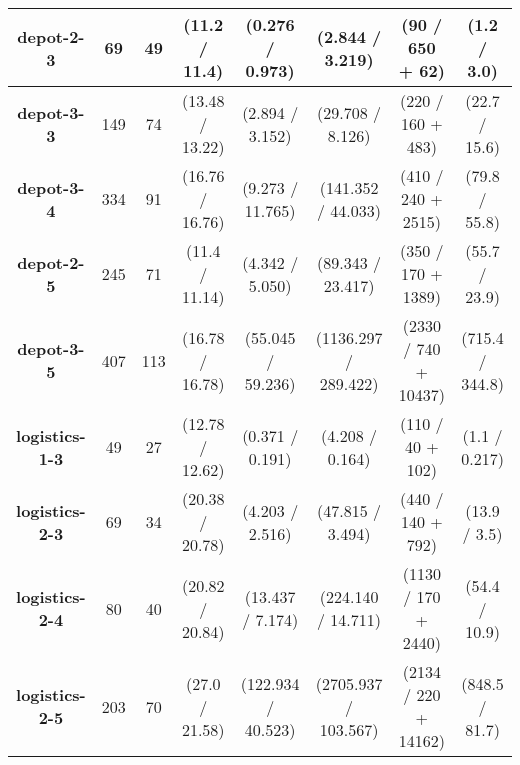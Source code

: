 \documentclass[letterpaper]{article} %
\theoremstyle{remark}
\begin{document}
\begin{table*}[]
\begin{tabular}{|c|c|c||c|c|c|c|c|}
\textbf{depot-2-3}     & 69                  & 49                & (11.2 / 11.4)      & (0.276 / 0.973)                             & (2.844 / 3.219)                           & (90 / 650 + 62)               & (1.2 / 3.0)               \\ \hline
\textbf{depot-3-3}     & 149                 & 74                & (13.48 / 13.22)    & (2.894 / 3.152)                             & (29.708 / 8.126)                          & (220 / 160 + 483)              & (22.7 / 15.6)             \\ \hline
\textbf{depot-3-4}     & 334                 & 91                & (16.76 / 16.76)    & (9.273 / 11.765)                            & (141.352 / 44.033)                        & (410 / 240 + 2515)              & (79.8 / 55.8)             \\ \hline
\textbf{depot-2-5}     & 245                 & 71                & (11.4 / 11.14)     & (4.342 / 5.050)                             & (89.343 / 23.417)                         & (350 / 170 + 1389)              & (55.7 / 23.9)             \\ \hline
\textbf{depot-3-5}     & 407                 & 113               & (16.78 / 16.78)    & (55.045 / 59.236)                           & (1136.297 / 289.422)                      & (2330 / 740 + 10437)             & (715.4 / 344.8)           \\ \hline\hline
\textbf{logistics-1-3} & 49                  & 27                & (12.78 / 12.62)    & (0.371 / 0.191)                             & (4.208 / 0.164)                           & (110 / 40 + 102)               & (1.1 / 0.217)             \\ \hline
\textbf{logistics-2-3} & 69                  & 34                & (20.38 / 20.78)    & (4.203 / 2.516)                             & (47.815 / 3.494)                          & (440 / 140 + 792)              & (13.9 / 3.5)              \\ \hline
\textbf{logistics-2-4} & 80                  & 40                & (20.82 / 20.84)    & (13.437 / 7.174)                            & (224.140 / 14.711)                        & (1130 / 170 + 2440)             & (54.4 / 10.9)             \\ \hline
\textbf{logistics-2-5} & 203                 & 70                & (27.0 / 21.58)     & (122.934 / 40.523)                          & (2705.937 / 103.567)                      & (2134 / 220 + 14162)             & (848.5 / 81.7)            \\ \hline

\end{tabular}
\end{table*}
\end{document}
